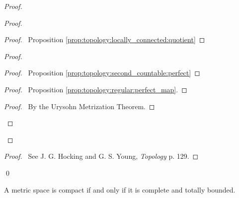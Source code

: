 \begin{proof}
\begin{proof}
  \begin{proof}
    \pf\ Proposition \ref{prop:topology:locally_connected:quotient}
  \end{proof}
  \begin{proof}
    \begin{proof}
      \pf\ Proposition \ref{prop:topology:second_countable:perfect}
    \end{proof}
    \begin{proof}
      \pf\ Proposition \ref{prop:topology:regular:perfect_map}.
    \end{proof}
    \qedstep
    \begin{proof}
      \pf\ By the Urysohn Metrization Theorem.
    \end{proof}
  \end{proof}
\end{proof}
  \begin{proof}
    \pf\ See J. G. Hocking and G. S. Young, \emph{Topology} p. 129.
  \end{proof}
  \qed
\end{proof}

\begin{thm}[DC]
  A metric space is compact if and only if it is complete and totally bounded.
\end{thm}

